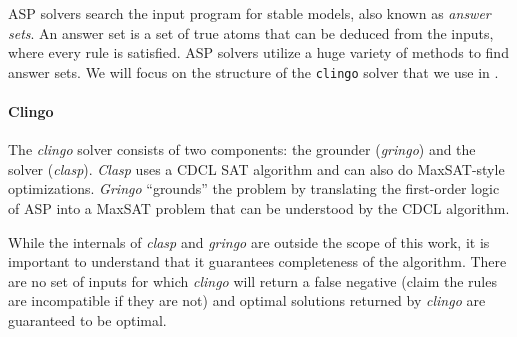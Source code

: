 ASP solvers search the input program for stable models, also known as \textit{answer sets}.
An answer set is a set of true atoms that can be deduced from the inputs, where every rule is satisfied.
ASP solvers utilize a huge variety of methods to find answer sets.
We will focus on the structure of the \texttt{clingo} solver that we use in \spack.

\paragraph{Clingo}

The \textit{clingo} solver consists of two components: the grounder (\textit{gringo}) and the solver (\textit{clasp}).
\textit{Clasp} uses a CDCL SAT algorithm and can also do MaxSAT-style optimizations.
\textit{Gringo} ``grounds'' the problem by translating the first-order logic of ASP into a MaxSAT problem that can be understood by the CDCL algorithm.

While the internals of \textit{clasp} and \textit{gringo} are outside the scope of this work, it is important to understand that it guarantees completeness of the algorithm.
There are no set of inputs for which \textit{clingo} will return a false negative (claim the rules are incompatible if they are not) and optimal solutions returned by \textit{clingo} are guaranteed to be optimal.

